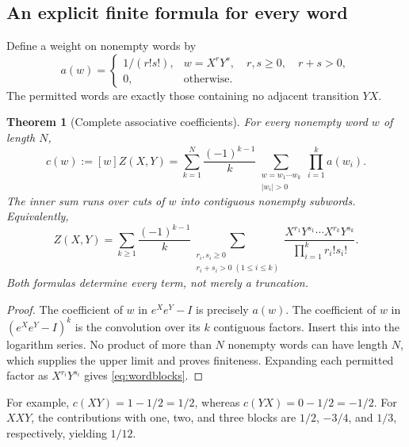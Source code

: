 \documentclass[11pt]{article}
\newtheorem{theorem}{Theorem}[section]
\theoremstyle{definition}
\theoremstyle{remark}
\newcommand{\coeff}[2]{[#1]#2}
\numberwithin{equation}{section}
\begin{document}
\subsection{An explicit finite formula for every word}
Define a weight on nonempty words by
\[
 a(w)=
 \begin{cases}
  1/(r!s!),& w=X^rY^s,\quad r,s\geq0,\quad r+s>0,\\
  0,&\text{otherwise}.
 \end{cases}
\]
The permitted words are exactly those containing no adjacent transition $YX$.
\begin{theorem}[Complete associative coefficients]\label{thm:word}
For every nonempty word $w$ of length $N$,
\begin{equation}\label{eq:wordcoefficient}
 c(w):=\coeff{w}{Z(X,Y)}
 =\sum_{k=1}^{N}\frac{(-1)^{k-1}}{k}
   \sum_{\substack{w=w_1\cdots w_k\\|w_i|>0}}
       \prod_{i=1}^k a(w_i).
\end{equation}
The inner sum runs over cuts of $w$ into contiguous nonempty subwords. Equivalently,
\begin{equation}\label{eq:wordblocks}
 Z(X,Y)=\sum_{k\geq1}\frac{(-1)^{k-1}}{k}
 \sum_{\substack{r_i,s_i\geq0\\r_i+s_i>0\;(1\leq i\leq k)}}
 \frac{X^{r_1}Y^{s_1}\cdots X^{r_k}Y^{s_k}}
      {\prod_{i=1}^k r_i!s_i!}.
\end{equation}
Both formulas determine every term, not merely a truncation.
\end{theorem}
\begin{proof}
The coefficient of $w$ in $e^Xe^Y-I$ is precisely $a(w)$. The coefficient of $w$ in $(e^Xe^Y-I)^k$ is the convolution over its $k$ contiguous factors. Insert this into the logarithm series. No product of more than $N$ nonempty words can have length $N$, which supplies the upper limit and proves finiteness. Expanding each permitted factor as $X^{r_i}Y^{s_i}$ gives \eqref{eq:wordblocks}.
\end{proof}
For example, $c(XY)=1-1/2=1/2$, whereas $c(YX)=0-1/2=-1/2$. For $XXY$, the contributions with one, two, and three blocks are $1/2$, $-3/4$, and $1/3$, respectively, yielding $1/12$.
\end{document}
